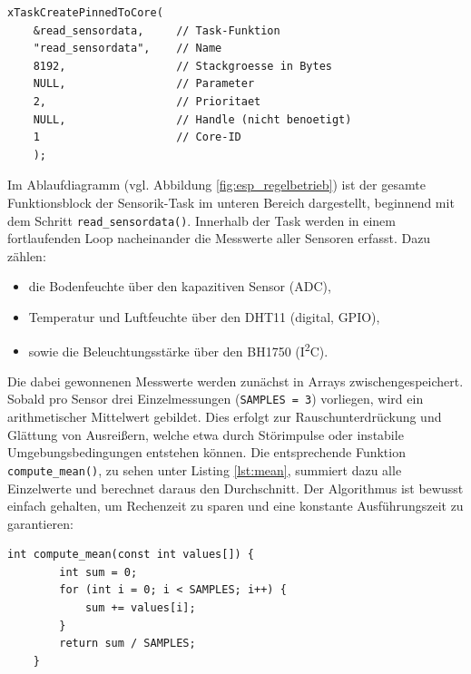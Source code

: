 \begin{lstlisting}[style=cstyle, caption={Start der Sensorik-Task}, label={lst:sensor_task}]
	xTaskCreatePinnedToCore(
	&read_sensordata,     // Task-Funktion
	"read_sensordata",    // Name
	8192,                 // Stackgroesse in Bytes
	NULL,                 // Parameter
	2,                    // Prioritaet
	NULL,                 // Handle (nicht benoetigt)
	1                     // Core-ID
	);
\end{lstlisting}
\vspace{1em}

\noindent Im Ablaufdiagramm (vgl. Abbildung \vref{fig:esp_regelbetrieb}) ist der gesamte Funktionsblock der Sensorik-Task im unteren Bereich dargestellt, beginnend mit dem Schritt \texttt{read\_sensordata()}. Innerhalb der Task werden in einem fortlaufenden Loop nacheinander die Messwerte aller Sensoren erfasst. Dazu zählen:
\\
\begin{itemize}
	\item die Bodenfeuchte über den kapazitiven Sensor (ADC),
	\item Temperatur und Luftfeuchte über den DHT11 (digital, GPIO),
	\item sowie die Beleuchtungsstärke über den BH1750 (I\textsuperscript{2}C).
\end{itemize}
\vspace{1em}

Die dabei gewonnenen Messwerte werden zunächst in Arrays zwischengespeichert. Sobald pro Sensor drei Einzelmessungen (\texttt{SAMPLES = 3}) vorliegen, wird ein arithmetischer Mittelwert gebildet. Dies erfolgt zur Rauschunterdrückung und Glättung von Ausreißern, welche etwa durch Störimpulse oder instabile Umgebungsbedingungen entstehen können. Die entsprechende Funktion \texttt{compute\_mean()}, zu sehen unter Listing \vref{lst:mean}, summiert dazu alle Einzelwerte und berechnet daraus den Durchschnitt. Der Algorithmus ist bewusst einfach gehalten, um Rechenzeit zu sparen und eine konstante Ausführungszeit zu garantieren:
\\

\begin{lstlisting}[style=cstyle, caption={Mittelwertbildung zur Glättung von Sensorwerten}, label={lst:mean}]
	int compute_mean(const int values[]) {
		int sum = 0;
		for (int i = 0; i < SAMPLES; i++) {
			sum += values[i];
		}
		return sum / SAMPLES;
	}
\end{lstlisting}
\vspace{1em}

